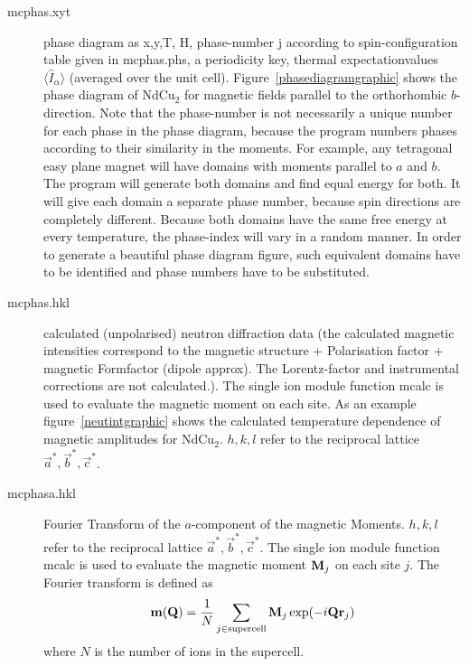 \begin{description}
\item [\prg mcphas.xyt]    phase diagram as x,y,T, H, phase-number j according to spin-configuration table
               given in mcphas.phs, a periodicity key, thermal expectationvalues $\langle \hat  I_{\alpha} \rangle$ 
               (averaged over the unit cell).
 Figure~\ref{phasediagramgraphic}
	       shows the phase diagram of NdCu$_2$ for magnetic fields parallel to the orthorhombic $b$-direction.
                            Note that  the phase-number is not necessarily a unique number for each phase in the phase diagram, because
the program numbers phases according to their similarity in the moments. For example, any tetragonal easy plane magnet 
will have domains with moments parallel to $a$ and $b$. The program will generate both domains and find equal energy for both. It will give each domain a separate phase number, because spin directions are completely different. Because both domains have the same free energy at every temperature, the phase-index will vary in a random manner. In order to generate a beautiful phase diagram figure, such equivalent domains have to be identified and phase numbers have to be substituted.
\item [\prg mcphas.hkl]    calculated (unpolarised) neutron diffraction data (the calculated magnetic intensities
    correspond to the magnetic structure + Polarisation factor + magnetic Formfactor (dipole approx). The
    Lorentz-factor  and  instrumental corrections are not calculated.). The single ion module function
    {\prg mcalc} is used to evaluate the magnetic moment on each site.
    As an example figure~\ref{neutintgraphic}
    shows the calculated temperature dependence of magnetic amplitudes for NdCu$_2$.
                           $h,k,l$ refer to the reciprocal lattice $\vec a^*,\vec b^*,\vec c^*$.
\item [\prg mcphasa.hkl]    Fourier Transform of the $a$-component of the magnetic Moments.
                           $h,k,l$ refer to the reciprocal lattice $\vec a^*,\vec b^*,\vec c^*$. The single ion module function
    {\prg mcalc} is used to evaluate the magnetic moment $\mathbf M_j$ on each site $j$. The Fourier transform is defined as
\begin{equation}
\mathbf m(\mathbf Q)=\frac{1}{N}\sum_{j \in {\rm supercell}} \mathbf M_j \exp(-i\mathbf Q \mathbf r_j) 
\end{equation}
 where $N$ is the number of ions in the supercell.


\end{description}
